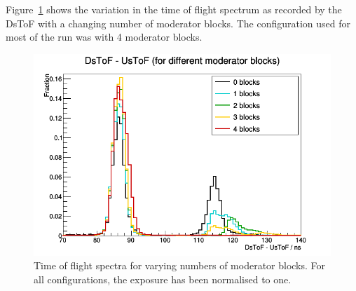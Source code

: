 	Figure~\ref{fig:dtof_nmodblocks} shows the variation in the time of flight spectrum as recorded by the DsToF with a changing number of moderator blocks. The configuration used for most of the run was with 4 moderator blocks. 
			
	

   	\begin{figure}[h]
        \centering
	    \includegraphics[width=0.7\linewidth]{files/Figures/AllInOne.png}
        \caption{Time of flight spectra for varying numbers of moderator blocks. For all configurations, the exposure has been normalised to one.}
        \label{fig:dtof_nmodblocks}	
   	\end{figure}
   
